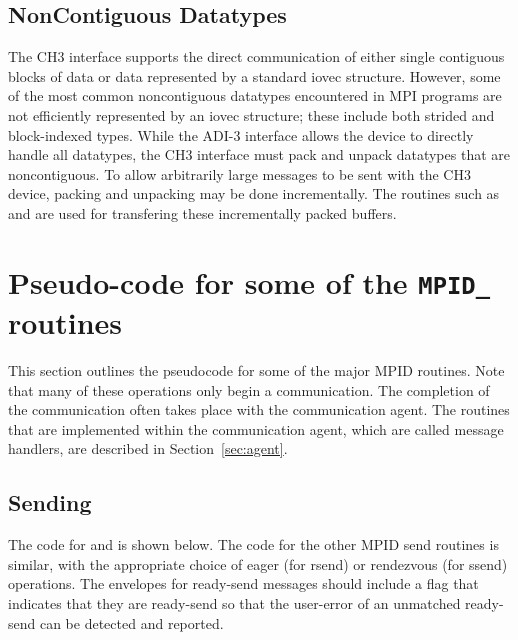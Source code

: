 \documentclass{article}
\def\texorpdfstring#1#2{#1}
\begin{document}
\subsection{NonContiguous Datatypes}
The CH3 interface supports the direct communication of either single
contiguous blocks of data or data represented by a standard iovec
structure.  However, some of the most common noncontiguous datatypes
encountered in MPI programs are not efficiently represented by an
iovec structure; these include both strided and block-indexed types.
While the ADI-3 interface allows the device to directly handle all
datatypes, the CH3 interface must pack and unpack datatypes that are
noncontiguous.  To allow arbitrarily large messages to be sent with
the CH3 device, packing and unpacking may be done incrementally.  The
routines such as  and  are used for
transfering these incrementally packed buffers.

\section{Pseudo-code for some of the
  \texorpdfstring{\texttt{MPID\_}}{MPID} routines} 
\label{sec:pseudo-code}
This section outlines the pseudocode for some of the major MPID
routines.
Note that many of these operations only begin a communication.  The
completion of the communication often takes place with the
communication agent.  The routines that are implemented within the
communication agent, which are called message handlers, are described
in Section~\ref{sec:agent}.

\subsection{Sending}
\label{sec:pseudocode-sending}
The code for  and  is shown below.  The code
for the other 
MPID send routines is similar, with the appropriate choice of eager
(for rsend) or rendezvous (for ssend) operations.  
The envelopes for ready-send messages should include
a flag that indicates that they are ready-send so that the user-error of an
unmatched ready-send can be detected and reported.
\end{document}

